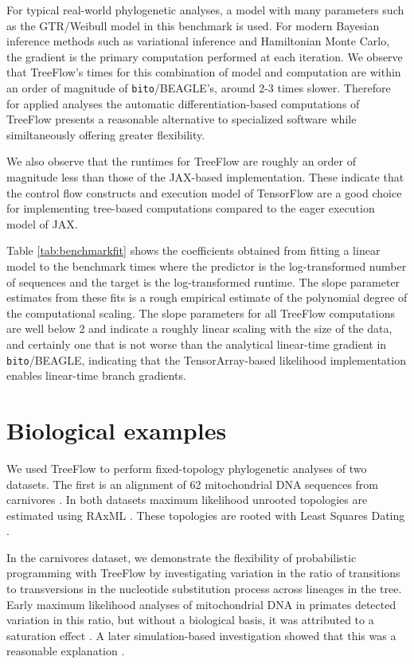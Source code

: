 For typical real-world phylogenetic analyses, a model with many parameters such as the GTR/Weibull model in this benchmark is used. For modern Bayesian inference methods such as variational inference and Hamiltonian Monte Carlo, the gradient is the primary computation performed at each iteration. We observe that TreeFlow's times for this combination of model and computation are within an order of magnitude of \texttt{bito}/BEAGLE's, around 2-3 times slower. Therefore for applied analyses the automatic differentiation-based computations of TreeFlow presents a reasonable alternative to specialized software while similtaneously offering greater flexibility.

We also observe that the runtimes for TreeFlow are roughly an order of magnitude less than those of the JAX-based implementation. These indicate that the control flow constructs and execution model of TensorFlow are a good choice for implementing tree-based computations compared to the eager execution model of JAX.

Table \ref{tab:benchmarkfit} shows the coefficients obtained from fitting a linear model to the benchmark times where the predictor is the log-transformed number of sequences and the target is the log-transformed runtime. The slope parameter estimates from these fits is a rough empirical estimate of the polynomial degree of the computational scaling. The slope parameters for all TreeFlow computations are well below 2 and indicate a roughly linear scaling with the size of the data, and certainly one that is not worse than the analytical linear-time gradient in \texttt{bito}/BEAGLE, indicating that the TensorArray-based likelihood implementation enables linear-time branch gradients.

\section{Biological examples}

We used TreeFlow to perform fixed-topology phylogenetic analyses of two datasets. The first is an alignment of 62 mitochondrial DNA sequences from carnivores \cite{suchard2009many}. In both datasets maximum likelihood unrooted topologies are estimated using RAxML \cite{stamatakis2014raxml}. These topologies are rooted with Least Squares Dating \cite{to2016lsd}.

In the carnivores dataset, we demonstrate the flexibility of probabilistic programming with TreeFlow by investigating variation in the ratio of transitions to transversions in the nucleotide substitution process across lineages in the tree. Early maximum likelihood analyses of mitochondrial DNA in primates detected variation in this ratio, but without a biological basis, it was attributed to a saturation effect \cite{yang1999estimation}. A later simulation-based investigation showed that this was a reasonable explanation \cite{duchene2015declining}.

